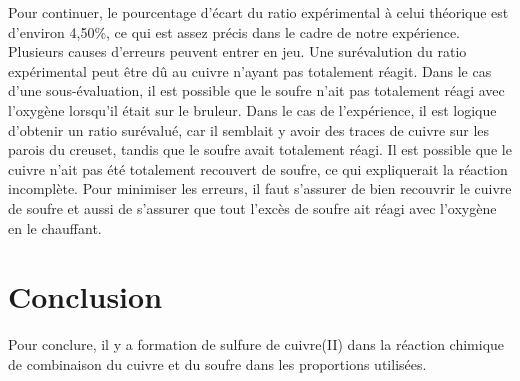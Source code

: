 \documentclass[11pt]{article}
\begin{document}
Pour continuer, le pourcentage d'écart du ratio expérimental à celui théorique est d'environ 4,50\%, ce qui est assez précis dans le cadre de notre expérience. Plusieurs causes d'erreurs peuvent entrer en jeu. Une surévalution du ratio expérimental peut être dû au cuivre n'ayant pas totalement réagit. Dans le cas d'une sous-évaluation, il est possible que le soufre n'ait pas totalement réagi avec l'oxygène lorsqu'il était sur le bruleur. Dans le cas de l'expérience, il est logique d'obtenir un ratio surévalué, car il semblait y avoir des traces de cuivre sur les parois du creuset, tandis que le soufre avait totalement réagi. Il est possible que le cuivre n'ait pas été totalement recouvert de soufre, ce qui expliquerait la réaction incomplète. Pour minimiser les erreurs, il faut s'assurer de bien recouvrir le cuivre de soufre et aussi de s'assurer que tout l'excès de soufre ait réagi avec l'oxygène en le chauffant.

\section*{Conclusion}
Pour conclure, il y a formation de sulfure de cuivre(II) dans la réaction chimique de combinaison du cuivre et du soufre dans les proportions utilisées.
\end{document}
